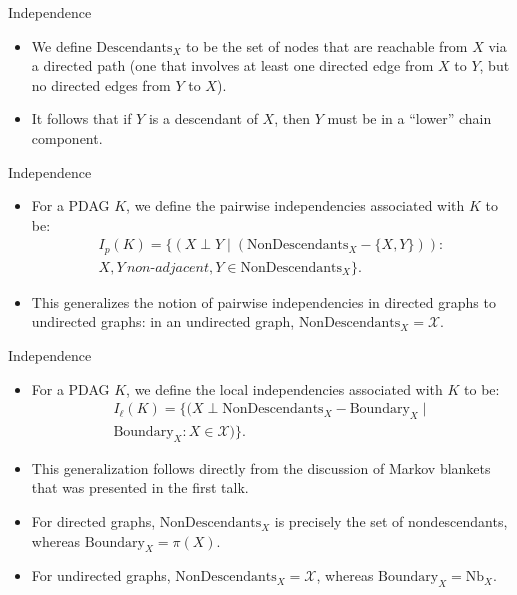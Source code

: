 \documentclass[11pt]{beamer}
\begin{document}
\begin{frame}{Independence}
\begin{itemize}
	\item We define $\text{Descendants}_{X}$ to be the set of nodes that are
	reachable from $X$ via a directed path (one that involves at least one
	directed edge from $X$ to $Y$, but no directed edges from $Y$ to $X$).
	\item It follows that if $Y$ is a descendant of $X$, then $Y$ must be in
	a ``lower'' chain component.
\end{itemize}
\end{frame}

\begin{frame}{Independence}
\begin{itemize}
	\item For a PDAG $K$, we define the pairwise independencies associated
	with $K$ to be:
	\begin{gather*}
		I_{p}(K) = \{(X \perp Y \;|\; (\text{NonDescendants}_{X} -
		\{X,Y\})) :\\X,Y \,\textit{non-adjacent}, Y \in
		\text{NonDescendants}_{X}\}.
	\end{gather*}
	\item This generalizes the notion of pairwise independencies in directed
	graphs to undirected graphs: in an undirected graph,
	$\text{NonDescendants}_{X} = \mathcal{X}$.
\end{itemize}
\end{frame}

\begin{frame}{Independence}
\begin{itemize}
	\item For a PDAG $K$, we define the local independencies associated with
	$K$ to be:
	\begin{gather*}
		I_{\ell}(K) = \{(X \perp \text{NonDescendants}_{X} -
		\text{Boundary}_{X} \;|\;\\\text{Boundary}_{X} : X \in
		\mathcal{X})\}.
	\end{gather*}
	\item This generalization follows directly from the discussion of Markov
	blankets that was presented in the first talk.
	\item For directed graphs, $\text{NonDescendants}_{X}$ is precisely the
	set of nondescendants, whereas $\text{Boundary}_{X} = \pi(X)$.
	\item For undirected graphs, $\text{NonDescendants}_{X} = \mathcal{X}$,
	whereas $\text{Boundary}_{X} = \text{Nb}_{X}$.
\end{itemize}
\end{frame}
\end{document}
